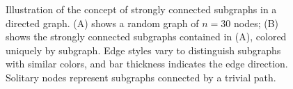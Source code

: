 \documentclass[11pt]{article}
\begin{document}
\begin{figure}[ht]
\centering
{}
\caption{Illustration of the concept of strongly connected subgraphs in a directed graph.  (A) shows a 
random graph of $n=30$ nodes; (B) shows the strongly connected subgraphs contained in (A), colored 
uniquely by subgraph.  Edge styles vary to distinguish subgraphs with similar colors, and bar thickness 
indicates the edge direction.  Solitary nodes represent subgraphs connected by a trivial path.}
\label{f:graphs}
\end{figure}
\end{document}
